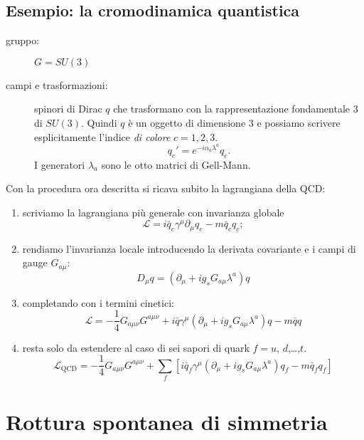 \documentclass[italian,a4paper]{article}
\theoremstyle{definition}
\newcommand{\lagr}{\ensuremath{\mathscr{L}}}
\newcommand{\dimu}{\ensuremath{\partial_{\mu}}}
\newcommand{\Dimu}{\ensuremath{D_{\mu}}}
\begin{document}
\subsection{Esempio: la cromodinamica quantistica}\label{qcd}
\begin{description}
    \item[gruppo:] $G = SU(3)$
    \item[campi e trasformazioni:] spinori di Dirac $q$ che trasformano con la
        rappresentazione fondamentale $3$ di $SU(3)$. Quindi $q$ \`e un
        oggetto di dimensione $3$ e possiamo scrivere esplicitamente
        l'indice \emph{di colore} $c = 1, 2, 3$. 
        \begin{equation*}
            q_c' = e^{-i \alpha_a \lambda^a}q_c.
        \end{equation*} I generatori $\lambda_a$ sono le otto matrici di
        Gell-Mann.
\end{description}
Con la procedura ora descritta si ricava subito la lagrangiana della QCD:
\begin{enumerate}
    \item scriviamo la lagrangiana pi\`u generale con invarianza globale
        \begin{equation*}
            \lagr = i \bar{q}_c\gamma^\mu\dimu q_c - m
            \bar{q}_c q_c;
        \end{equation*}
    \item rendiamo l'invarianza locale introducendo la derivata covariante e
        i campi di gauge $G_{a\mu}$:
        \begin{equation*}
            \Dimu q = (\dimu + i g_s G_{a\mu}\lambda^a)q
        \end{equation*}
\item completando con i termini cinetici:
    \begin{equation*}
        \lagr = - \dfrac{1}{4}G_{a\mu\nu}G^{a\mu\nu} + i \bar q
        \gamma^\mu(\dimu + i g_s G_{a\mu}\lambda^a)q - m \bar q q
    \end{equation*}
\item resta solo da estendere al caso di sei sapori di quark $f = u$,
    $d$,\dots,$t$.
    \begin{equation*}
        \lagr_{\text{QCD}} = - \dfrac{1}{4}G_{a\mu\nu}G^{a\mu\nu} + \sum_f[i
        \bar q_f
        \gamma^\mu(\dimu + i g_s G_{a\mu}\lambda^a)q_f - m \bar q_f q_f]         
    \end{equation*}
\end{enumerate}
\section{Rottura spontanea di simmetria}
\end{document}
